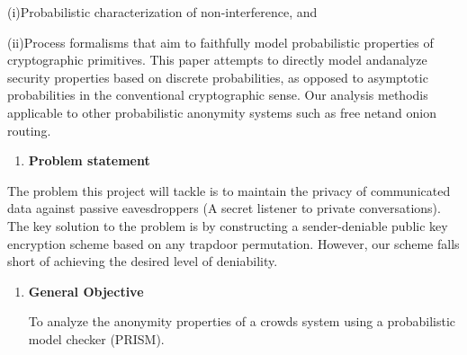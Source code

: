 \documentclass[10pt]{article}
\begin{document}
{\raggedright
(i){\large  }Probabilistic characterization of non-interference, and
}

{\raggedright
(ii){\large  }Process formalisms that aim to faithfully model probabilistic
properties of cryptographic primitives. This paper attempts to directly model
and{\large  }analyze security properties based on discrete probabilities, as
opposed to asymptotic probabilities in the conventional cryptographic sense. Our
analysis method{\large  }is applicable to other probabilistic anonymity systems
such as free net{\large  }and onion routing.
}

\begin{enumerate}
	\item \textbf{{\large Problem statement}}
\end{enumerate}

{\raggedright
{\large The problem this project will tackle is to maintain the privacy of
communicated data against passive eavesdroppers (A secret listener to private
conversations). The key solution to the problem is by constructing a
sender-deniable public key encryption scheme based on any trapdoor permutation.
However, our scheme falls short of achieving the desired level of deniability. }
}
\begin{enumerate}
	\item \textbf{{\large General Objective}}
	{\raggedright
{\large To analyze the anonymity properties of a crowds system using a probabilistic model checker (PRISM). }
}
\end{enumerate}
\end{document}
